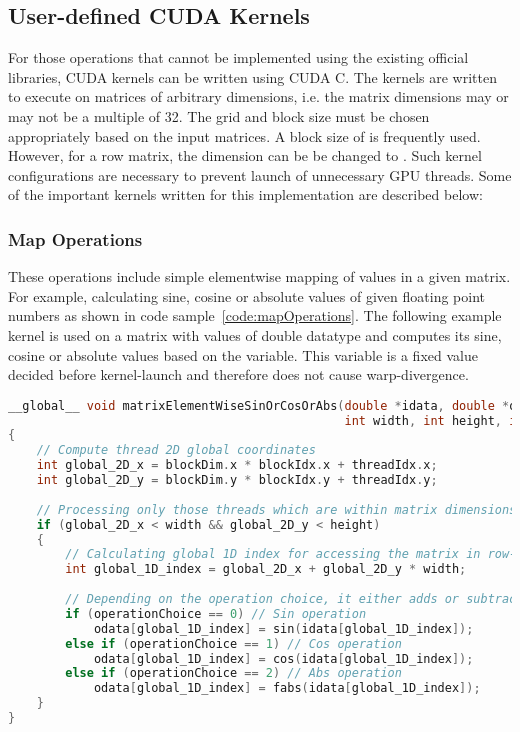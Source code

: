 \documentclass[thesis.tex]{subfiles}
\begin{document}
\subsection{User-defined CUDA Kernels}
For those operations that cannot be implemented using the existing official libraries, CUDA kernels can be written using CUDA C. The kernels are written to execute on matrices of arbitrary dimensions, i.e. the matrix dimensions may or may not be a multiple of 32. The grid and block size must be chosen appropriately based on the input matrices. A block size of  is frequently used. However, for a row matrix, the dimension can be be changed to . Such kernel configurations are necessary to prevent launch of unnecessary GPU threads.
Some of the important kernels written for this implementation are described below:

\subsubsection{Map Operations}
These operations include simple elementwise mapping of values in a given matrix. For example, calculating sine, cosine or absolute values of given floating point numbers as shown in code sample~\ref{code:mapOperations}. The following example kernel is used on a matrix with values of double datatype and computes its sine, cosine or absolute values based on the  variable. This variable is a fixed value decided before kernel-launch and therefore does not cause warp-divergence.
\lstset{aboveskip=10pt,belowskip=10pt} %
\begin{lstlisting}[language=C, caption={CUDA kernel for map operations: sin, cosine or absolute values of given matrix}, captionpos=b, label={code:mapOperations}]
__global__ void matrixElementWiseSinOrCosOrAbs(double *idata, double *odata,
											   int width, int height, int operationChoice)
{
	// Compute thread 2D global coordinates
	int global_2D_x = blockDim.x * blockIdx.x + threadIdx.x;
	int global_2D_y = blockDim.y * blockIdx.y + threadIdx.y;
	
	// Processing only those threads which are within matrix dimensions
	if (global_2D_x < width && global_2D_y < height)
	{
		// Calculating global 1D index for accessing the matrix in row-major fashion
		int global_1D_index = global_2D_x + global_2D_y * width;
		
		// Depending on the operation choice, it either adds or subtracts
		if (operationChoice == 0) // Sin operation
			odata[global_1D_index] = sin(idata[global_1D_index]);
		else if (operationChoice == 1) // Cos operation
			odata[global_1D_index] = cos(idata[global_1D_index]);
		else if (operationChoice == 2) // Abs operation
			odata[global_1D_index] = fabs(idata[global_1D_index]);
	}
}
\end{lstlisting}
\end{document}
